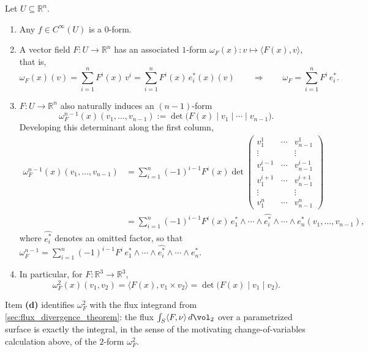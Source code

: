 \begin{example}
Let $U \subseteq \mathbb{R}^n$.
\begin{enumerate}[label=\textbf{(\alph*)}]
  \item Any $f \in C^\infty(U)$ is a $0$-form.
  \item A vector field $F : U \to \mathbb{R}^n$ has an associated $1$-form $\omega_F(x) : v
  \mapsto \langle F(x),v\rangle$, that is,
  \[\omega_F(x)(v) = \sum_{i=1}^n F^i(x)\,v^i = \sum_{i=1}^n F^i(x)\,e_i^*(x)(v)
    \qquad\Longrightarrow\qquad \omega_F = \sum_{i=1}^n F^i\,e_i^*.\]
  \item $F : U \to \mathbb{R}^n$ also naturally induces an $(n-1)$-form
  \[\omega_F^{n-1}(x)(v_1,\ldots,v_{n-1}) := \det\big(F(x)\mid v_1\mid\cdots\mid v_{n-1}\big).\]
  Developing this determinant along the first column,
  \begin{align}
  \omega_F^{n-1}(x)(v_1,\ldots,v_{n-1}) &= \sum_{i=1}^n (-1)^{i-1}F^i(x)\det\!\left(
    \begin{smallmatrix} v_1^1 & \cdots & v_{n-1}^1 \\ \vdots & & \vdots \\ v_1^{i-1} & \cdots &
    v_{n-1}^{i-1} \\ v_1^{i+1} & \cdots & v_{n-1}^{i+1} \\ \vdots & & \vdots \\ v_1^n &
    \cdots & v_{n-1}^n \end{smallmatrix}\right) \nonumber \\
    &= \sum_{i=1}^n (-1)^{i-1}F^i(x)\,e_1^*\wedge\cdots\wedge\widehat{e_i^*}\wedge\cdots\wedge
    e_n^*(v_1,\ldots,v_{n-1}), \nonumber
  \end{align}
  where $\widehat{e_i^*}$ denotes an omitted factor, so that $\omega_F^{n-1} =
  \sum_{i=1}^n (-1)^{i-1}F^i\,e_1^*\wedge\cdots\wedge\widehat{e_i^*}\wedge\cdots\wedge e_n^*$.
  \item In particular, for $F : \mathbb{R}^3 \to \mathbb{R}^3$,
  \[\omega_F^2(x)(v_1,v_2) = \langle F(x),v_1\times v_2\rangle = \det\big(F(x)\mid v_1\mid
    v_2\big).\]
\end{enumerate}
\end{example}

\begin{ainote}
Item \textbf{(d)} identifies $\omega_F^2$ with the flux integrand from
\cref{sec:flux_divergence_theorem}: the flux $\int_S \langle F,\nu\rangle\,d\vol_2$ over a parametrized surface is
exactly the integral, in the sense of the motivating change-of-variables calculation above, of
the $2$-form $\omega_F^2$.
\end{ainote}

